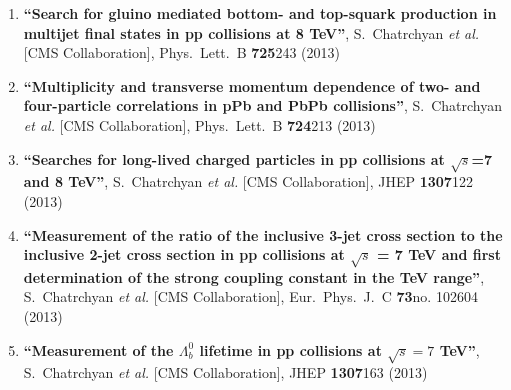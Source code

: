 \begin{enumerate}
\item%
{\bf ``Search for gluino mediated bottom- and top-squark production in multijet final states in pp collisions at 8 TeV''}, 
  S.~Chatrchyan {\it et al.}  [CMS Collaboration], 
Phys.\ Lett.\ B {\bf 725}243 (2013) %


\item%
{\bf ``Multiplicity and transverse momentum dependence of two- and four-particle correlations in pPb and PbPb collisions''}, 
  S.~Chatrchyan {\it et al.}  [CMS Collaboration], 
Phys.\ Lett.\ B {\bf 724}213 (2013) %


\item%
{\bf ``Searches for long-lived charged particles in pp collisions at $\sqrt{s}$=7 and 8 TeV''}, 
  S.~Chatrchyan {\it et al.}  [CMS Collaboration], 
JHEP {\bf 1307}122 (2013) %


\item%
{\bf ``Measurement of the ratio of the inclusive 3-jet cross section to the inclusive 2-jet cross section in pp collisions at $\sqrt{s}$ = 7 TeV and first determination of the strong coupling constant in the TeV range''}, 
  S.~Chatrchyan {\it et al.}  [CMS Collaboration], 
Eur.\ Phys.\ J.\ C {\bf 73}no. 102604 (2013) %


\item%
{\bf ``Measurement of the $\Lambda_{b}^0$ lifetime in pp collisions at $\sqrt{s} = 7$ TeV''}, 
  S.~Chatrchyan {\it et al.}  [CMS Collaboration], 
JHEP {\bf 1307}163 (2013) %



\end{enumerate}
